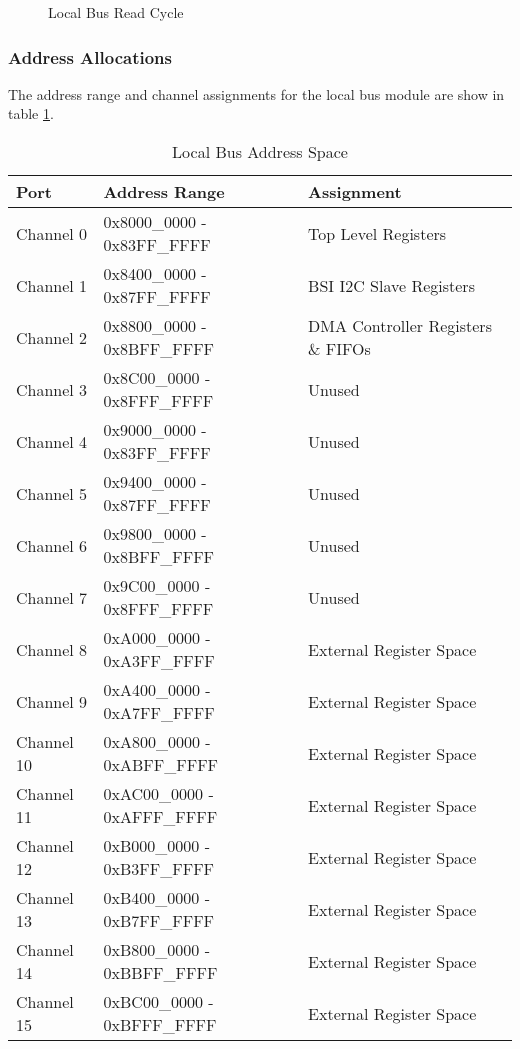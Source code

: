 \documentclass[11pt]{article}
\begin{document}
\begin{figure}[H]
   \centering
   \caption{Local Bus Read Cycle}
   \label{fig:lb_read_cycle}
\end{figure}

\subsubsection{Address Allocations}

The address range and channel assignments for the local bus module are show in table \ref{tab:lb_addr_ports}. 

\begin{table}[H]
\small
\centering
   \begin{tabular}{| l | l | l | } 
      \hline \textbf{Port} & \textbf{Address Range} & \textbf{Assignment} \\
      \hline Channel 0  & 0x8000\_0000 - 0x83FF\_FFFF & Top Level Registers \\
      \hline Channel 1  & 0x8400\_0000 - 0x87FF\_FFFF & BSI I2C Slave Registers \\
      \hline Channel 2  & 0x8800\_0000 - 0x8BFF\_FFFF & DMA Controller Registers \& FIFOs \\
      \hline Channel 3  & 0x8C00\_0000 - 0x8FFF\_FFFF & Unused \\
      \hline Channel 4  & 0x9000\_0000 - 0x83FF\_FFFF & Unused \\
      \hline Channel 5  & 0x9400\_0000 - 0x87FF\_FFFF & Unused \\
      \hline Channel 6  & 0x9800\_0000 - 0x8BFF\_FFFF & Unused \\
      \hline Channel 7  & 0x9C00\_0000 - 0x8FFF\_FFFF & Unused \\
      \hline Channel 8  & 0xA000\_0000 - 0xA3FF\_FFFF & External Register Space \\
      \hline Channel 9  & 0xA400\_0000 - 0xA7FF\_FFFF & External Register Space \\
      \hline Channel 10 & 0xA800\_0000 - 0xABFF\_FFFF & External Register Space \\
      \hline Channel 11 & 0xAC00\_0000 - 0xAFFF\_FFFF & External Register Space \\
      \hline Channel 12 & 0xB000\_0000 - 0xB3FF\_FFFF & External Register Space \\
      \hline Channel 13 & 0xB400\_0000 - 0xB7FF\_FFFF & External Register Space \\
      \hline Channel 14 & 0xB800\_0000 - 0xBBFF\_FFFF & External Register Space \\
      \hline Channel 15 & 0xBC00\_0000 - 0xBFFF\_FFFF & External Register Space \\
      \hline
   \end{tabular}
   \caption{Local Bus Address Space }
   \label{tab:lb_addr_ports}
\end{table}
\end{document}
